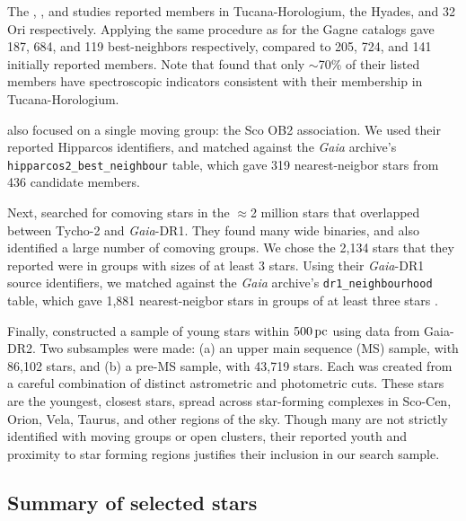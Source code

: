 \documentclass[12pt,twocolumn,tighten]{aastex62}
\begin{document}
The \citet{kraus_tucanahor_2014}, \citet{roser_deep_2011}, and
\citet{bell_32ori_2017} studies reported members in Tucana-Horologium,
the Hyades, and 32$\,$Ori respectively.  Applying the same procedure as
for the Gagne catalogs gave 187, 684, and 119 best-neighbors
respectively, compared to 205, 724, and 141 initially reported
members.  Note that \citet{kraus_tucanahor_2014} found that only
$\sim$70\% of their listed members have spectroscopic indicators
consistent with their membership in Tucana-Horologium.

\citet{rizzuto_multidimensional_2011} also focused on a single moving
group: the Sco OB2 association. We used their reported Hipparcos
identifiers, and matched against the {\it Gaia} archive's
\texttt{hipparcos2\_best\_neighbour} table, which gave 319
nearest-neigbor stars from 436 candidate members.

Next, \citet{oh_comoving_2017} searched for comoving stars in the
$\approx$2 million stars that overlapped between Tycho-2 and {\it
Gaia}-DR1.  They found many wide binaries, and also identified a large
number of comoving groups.  We chose the 2{,}134 stars that they
reported were in groups with sizes of at least 3 stars.  Using their
{\it Gaia}-DR1 source identifiers, we matched against the {\it Gaia}
archive's \texttt{dr1\_neighbourhood} table, which gave 1{,}881
nearest-neigbor stars in groups of at least three stars
\citep{marrese_gaia_2019}.

Finally, \citet{zari_3d_2018} constructed a sample of young stars
within $500\,{\rm pc}$ using data from Gaia-DR2. Two subsamples were
made: (a) an upper main sequence (MS) sample, with 86{,}102 stars, and
(b) a pre-MS sample, with 43{,}719 stars.  Each was created from a
careful combination of distinct astrometric and photometric cuts.
These stars are the youngest, closest stars, spread across
star-forming complexes in Sco-Cen, Orion, Vela, Taurus, and other
regions of the sky.  Though many are not strictly identified with
moving groups or open clusters, their reported youth and proximity to star
forming regions justifies their inclusion in our search sample.


\subsection{Summary of selected stars}
\label{subsec:ocmgsummary}
\end{document}
